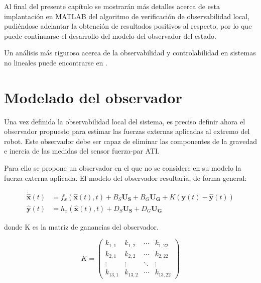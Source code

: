 Al final del presente capítulo se mostrarán más detalles acerca de esta implantación en MATLAB del algoritmo de verificación de observabilidad local, pudiéndose adelantar la obtención de resultados positivos al respecto, por lo que puede continuarse el desarrollo del modelo del observador del estado. \par

Un análisis más riguroso acerca de la observabilidad y controlabilidad en sistemas no lineales puede encontrarse en \cite{hermann1977nonlinear}. \par 

\section{Modelado del observador}

Una vez definida la observabilidad local del sistema, es preciso definir ahora el observador propuesto para estimar las fuerzas externas aplicadas al extremo del robot. Este observador debe ser capaz de eliminar las componentes de la gravedad e inercia de las medidas del sensor fuerza-par ATI.

Para ello se propone un observador en el que no se considere en su modelo la fuerza externa aplicada. El modelo del observador resultaría, de forma general:

\begin{subequations}
\begin{align}
	\boldsymbol{\dot{\hat{x}}}(t) &= f_x(\boldsymbol{\hat{x}}(t),t) + 							B_S\boldsymbol{U_S} + B_G\boldsymbol{U_G} + K(\boldsymbol{y}(t) - 						\boldsymbol{\hat{y}}(t)) \\
	\boldsymbol{\hat{y}}(t) &= h_x(\boldsymbol{\hat{x}}(t),t) + D_S\boldsymbol{U_S} + D_G\boldsymbol{U_G}
\end{align}
\label{eq:ecObservador}
\end{subequations}

\noindent
donde K es la matriz de ganancias del observador.

\begin{equation}
	K =
	 \begin{pmatrix}
	  k_{1,1} & k_{1,2} & \cdots & k_{1,22} \\
	  k_{2,1} & k_{2,2} & \cdots & k_{2,22} \\
	  \vdots  & \vdots  & \ddots & \vdots  \\
	  k_{13,1} & k_{13,2} & \cdots & k_{13,22}
	 \end{pmatrix}
\end{equation}

